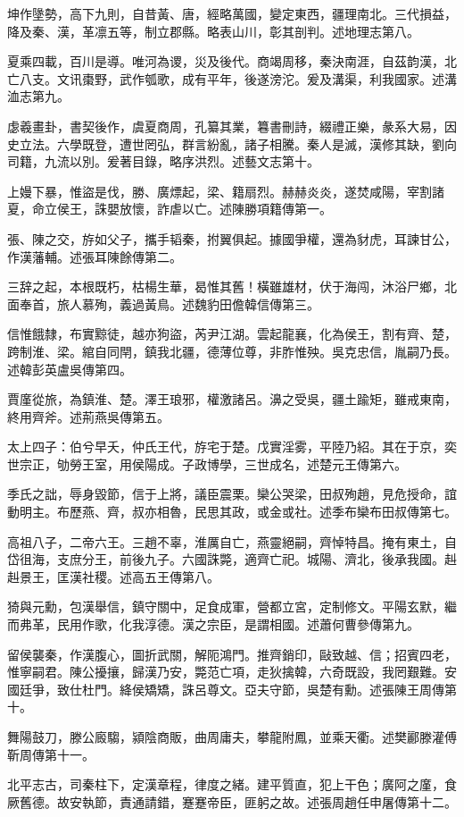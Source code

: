 \begin{pinyinscope}
坤作墬勢，高下九則，自昔黃、唐，經略萬國，變定東西，疆理南北。三代損益，降及秦、漢，革凛五等，制立郡縣。略表山川，彰其剖判。述地理志第八。

夏乘四載，百川是導。唯河為谡，災及後代。商竭周移，秦決南涯，自茲韵漢，北亡八支。文讯棗野，武作瓠歌，成有平年，後遂滂沱。爰及溝渠，利我國家。述溝洫志第九。

虙羲畫卦，書契後作，虞夏商周，孔纂其業，篹書刪詩，綴禮正樂，彖系大易，因史立法。六學既登，遭世罔弘，群言紛亂，諸子相騰。秦人是滅，漢修其缺，劉向司籍，九流以別。爰著目錄，略序洪烈。述藝文志第十。

上嫚下暴，惟盜是伐，勝、廣熛起，梁、籍扇烈。赫赫炎炎，遂焚咸陽，宰割諸夏，命立侯王，誅嬰放懷，詐虐以亡。述陳勝項籍傳第一。

張、陳之交，斿如父子，攜手韬秦，拊翼俱起。據國爭權，還為豺虎，耳諫甘公，作漢藩輔。述張耳陳餘傳第二。

三辞之起，本根既朽，枯楊生華，曷惟其舊！橫雖雄材，伏于海闯，沐浴尸鄉，北面奉首，旅人慕殉，義過黃鳥。述魏豹田儋韓信傳第三。

信惟餓隸，布實黥徒，越亦狗盜，芮尹江湖。雲起龍襄，化為侯王，割有齊、楚，跨制淮、梁。綰自同閈，鎮我北疆，德薄位尊，非胙惟殃。吳克忠信，胤嗣乃長。述韓彭英盧吳傳第四。

賈廑從旅，為鎮淮、楚。澤王琅邪，權激諸呂。濞之受吳，疆土踰矩，雖戒東南，終用齊斧。述荊燕吳傳第五。

太上四子：伯兮早夭，仲氏王代，斿宅于楚。戊實淫雾，平陸乃紹。其在于京，奕世宗正，劬勞王室，用侯陽成。子政博學，三世成名，述楚元王傳第六。

季氏之詘，辱身毀節，信于上將，議臣震栗。欒公哭梁，田叔殉趙，見危授命，誼動明主。布歷燕、齊，叔亦相魯，民思其政，或金或社。述季布欒布田叔傳第七。

高祖八子，二帝六王。三趙不辜，淮厲自亡，燕靈絕嗣，齊悼特昌。掩有東土，自岱徂海，支庶分王，前後九子。六國誅斃，適齊亡祀。城陽、濟北，後承我國。赳赳景王，匡漢社稷。述高五王傳第八。

猗與元勳，包漢舉信，鎮守關中，足食成軍，營都立宮，定制修文。平陽玄默，繼而弗革，民用作歌，化我淳德。漢之宗臣，是謂相國。述蕭何曹參傳第九。

留侯襲秦，作漢腹心，圖折武關，解阨鴻門。推齊銷印，敺致越、信；招賓四老，惟寧嗣君。陳公擾攘，歸漢乃安，斃范亡項，走狄擒韓，六奇既設，我罔艱難。安國廷爭，致仕杜門。絳侯矯矯，誅呂尊文。亞夫守節，吳楚有勳。述張陳王周傳第十。

舞陽鼓刀，滕公廄騶，潁陰商販，曲周庸夫，攀龍附鳳，並乘天衢。述樊酈滕灌傅靳周傳第十一。

北平志古，司秦柱下，定漢章程，律度之緒。建平質直，犯上干色；廣阿之廑，食厥舊德。故安執節，責通請錯，蹇蹇帝臣，匪躬之故。述張周趙任申屠傳第十二。


\end{pinyinscope}
